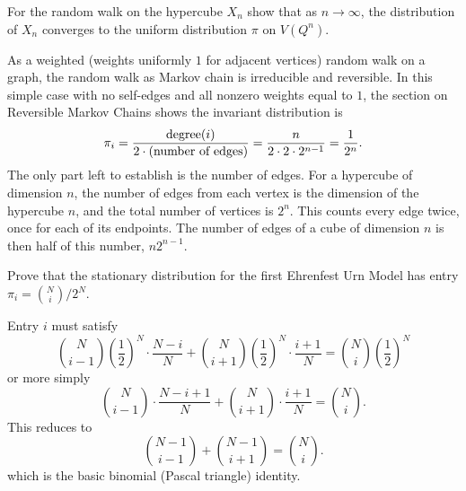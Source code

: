 \documentclass[12pt]{article}
\begin{document}
\begin{exercise}
    For the random walk on the hypercube \( X_n \) show that as \( n \to
    \infty \), the distribution of \( X_n \) converges to the uniform
    distribution \( \pi \) on \( V(Q^n) \).
\end{exercise}
\begin{solution}
    As a weighted (weights uniformly \( 1 \) for adjacent vertices)
    random walk on a graph, the random walk as Markov chain is
    irreducible and reversible.  In this simple case with no self-edges
    and all nonzero weights equal to \( 1 \), the section on Reversible
    Markov Chains shows the invariant distribution is
    \[
        \pi_i = \frac{%
        \operatorname{degree}
        (i)}{2 \cdot (\text{number of edges})} = \frac{n}{2 \cdot 2
        \cdot 2^{n-1}} = \frac{1}{2^n}.
    \] The only part left to establish is the number of edges.  For a
    hypercube of dimension \( n \), the number of edges from each vertex
    is the dimension of the hypercube \( n \), and the total number of
    vertices is \( 2^n \).  This counts every edge twice, once for each
    of its endpoints.  The number of edges of a cube of dimension \( n \)
    is then half of this number, \( n 2^{n-1} \).
\end{solution}

\begin{exercise}
    Prove that the stationary distribution for the first Ehrenfest Urn
    Model has entry \( \pi_i = \binom{N}{i}/2^N \).
\end{exercise}

\begin{solution}
    Entry \( i \) must satisfy
    \[
        \binom{N}{i-1}\left( \frac{1}{2} \right)^N \cdot \frac{N-i}{N} +
        \binom{N}{i+1}\left( \frac{1}{2} \right)^N \cdot \frac{i+1}{N} =
        \binom{N}{i}\left( \frac{1}{2} \right)^N
    \] or more simply
    \[
        \binom{N}{i-1} \cdot \frac{N-i+1}{N} + \binom{N}{i+1} \cdot
        \frac{i+1}{N} = \binom{N}{i}.
    \] This reduces to
    \[
        \binom{N-1}{i-1} + \binom{N-1}{i+1} = \binom{N}{i}.
    \] which is the basic binomial (Pascal triangle) identity.
\end{solution}
\end{document}
